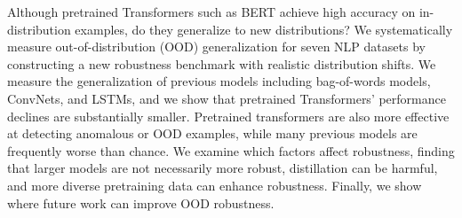 Although pretrained Transformers such as BERT achieve high accuracy on in-distribution examples, do they generalize to new distributions? We systematically measure out-of-distribution (OOD) generalization for seven NLP datasets by constructing a new robustness benchmark with realistic distribution shifts. We measure the generalization of previous models including bag-of-words models, ConvNets, and LSTMs, and we show that pretrained Transformers' performance declines are substantially smaller. Pretrained transformers are also more effective at detecting anomalous or OOD examples, while many previous models are frequently worse than chance. We examine which factors affect robustness, finding that larger models are not necessarily more robust, distillation can be harmful, and more diverse pretraining data can enhance robustness. Finally, we show where future work can improve OOD robustness.
